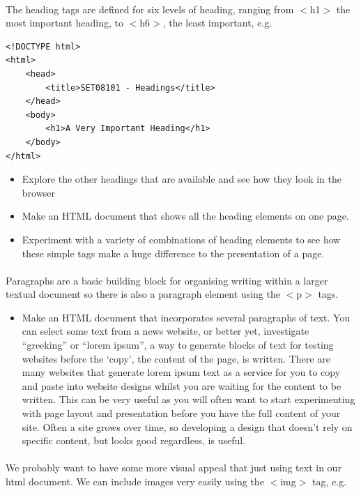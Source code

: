 \documentclass[10pt, a4paper, twosize]{article}
\begin{document}
\paragraph{} The heading tags are defined for six levels of heading, ranging from $<$h1$>$ the most important heading, to $<$h6$>$, the least important, e.g.

\begin{lstlisting}
<!DOCTYPE html>
<html>
    <head>
        <title>SET08101 - Headings</title>
    </head>
    <body>
        <h1>A Very Important Heading</h1>      
    </body>
</html>
\end{lstlisting}

\begin{itemize}
\item Explore the other headings that are available and see how they look in the browser
\item Make an HTML document that shows all the heading elements on one page.
\item Experiment with a variety of combinations of heading elements to see how these simple tags make a huge difference to the presentation of a page.
\end{itemize}

\paragraph{} Paragraphs are a basic building block for organising writing within a larger textual document so there is also a paragraph element using the $<$p$>$ tags.

\begin{itemize}
\item Make an HTML document that incorporates several paragraphs of text. You can select some text from a news website, or better yet, investigate ``greeking'' or ``lorem ipsum'', a way to generate blocks of text for testing websites before the `copy', the content of the page, is written. There are many websites that generate lorem ipsum text as a service for you to copy and paste into website designs whilst you are waiting for the content to be written. This can be very useful as you will often want to start experimenting with page layout and presentation before you have the full content of your site. Often a site grows over time, so developing a design that doesn't rely on specific content, but looks good regardless, is useful.
\end{itemize}

\paragraph{} We probably want to have some more visual appeal that just using text in our html document. We can include images very easily using the $<$img$>$ tag, e.g.
\end{document}
